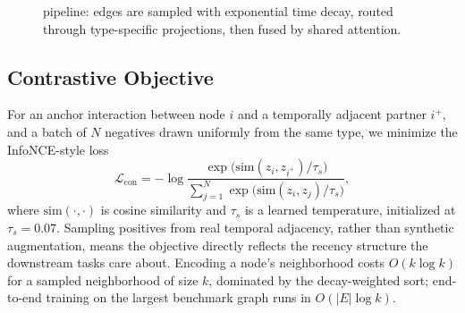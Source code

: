 \begin{figure}[t]
\centering
{}
\caption{\sysname{} pipeline: edges are sampled with exponential time decay,
routed through type-specific projections, then fused by shared attention.}
\label{fig:arch}
\end{figure}

\subsection{Contrastive Objective}
For an anchor interaction between node $i$ and a temporally adjacent
partner $i^+$, and a batch of $N$ negatives drawn uniformly from the same
type, we minimize the InfoNCE-style loss
\begin{equation}
\mathcal{L}_{\text{con}} = -\log
\frac{\exp\!\big(\mathrm{sim}(z_i, z_{i^+}) / \tau_s\big)}
     {\sum_{j=1}^{N} \exp\!\big(\mathrm{sim}(z_i, z_j) / \tau_s\big)},
\label{eq:contrastive}
\end{equation}
where $\mathrm{sim}(\cdot,\cdot)$ is cosine similarity and $\tau_s$ is a
learned temperature, initialized at $\tau_s = 0.07$. Sampling positives from
real temporal adjacency, rather than synthetic augmentation, means the
objective directly reflects the recency structure the downstream tasks care
about. Encoding a node's neighborhood costs $O(k \log k)$ for a sampled
neighborhood of size $k$, dominated by the decay-weighted sort; end-to-end
training on the largest benchmark graph runs in $O(|E| \log k)$.
